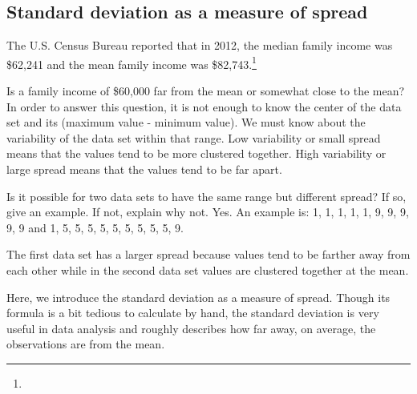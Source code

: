 \subsection{Standard deviation as a measure of spread}
\label{variability}

The U.S. Census Bureau reported that in 2012, the median family income was \$62,241 and the mean family income was \$82,743.\footnote{}

Is a family income of \$60,000 far from the mean or somewhat close to the mean? In order to answer this question, it is not enough to know the center of the data set and its  (maximum value - minimum value). We must know about the variability of the data set within that range. Low variability or small spread means that the values tend to be more clustered together. High variability or large spread means that the values tend to be far apart.

\begin{example}{Is it possible for two data sets to have the same range but different spread? If so, give an example. If not, explain why not.}
Yes. An example is:  {1, 1, 1, 1, 1, 9, 9, 9, 9, 9} and {1, 5, 5, 5, 5, 5, 5, 5, 5, 5, 9}.

The first data set has a larger spread because values tend to be farther away from each other while in the second data set values are clustered together at the mean.
\end{example}

Here, we introduce the standard deviation as a measure of spread. Though its formula is a bit tedious to calculate by hand, the standard deviation is very useful in data analysis and roughly describes how far away, on average, the observations are from the mean.

